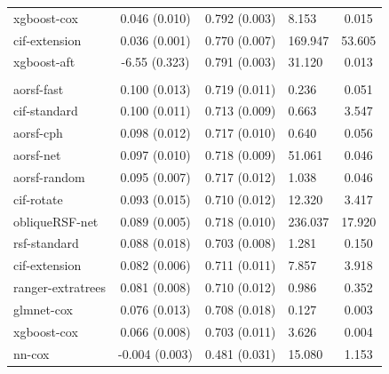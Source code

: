 \documentclass[twoside,11pt]{article}\usepackage[]{graphicx}\usepackage[]{xcolor}
\newenvironment{knitrout}{}{} %
\begin{document}
\begin{knitrout}
\begin{longtable}[t]{lcclc}
\hspace{1em}xgboost-cox & 0.046 (0.010) & 0.792 (0.003) & 8.153 & 0.015\\
\hspace{1em}cif-extension & 0.036 (0.001) & 0.770 (0.007) & 169.947 & 53.605\\
\hspace{1em}xgboost-aft & -6.55 (0.323) & 0.791 (0.003) & 31.120 & 0.013\\
\addlinespace[0.3em]
\hline
\multicolumn{5}{l}{\textit{\textbf{Colon cancer; death, n = 929, p = 12}}}\\
\hline
\hspace{1em}aorsf-fast & 0.100 (0.013) & 0.719 (0.011) & 0.236 & 0.051\\
\hspace{1em}cif-standard & 0.100 (0.011) & 0.713 (0.009) & 0.663 & 3.547\\
\hspace{1em}aorsf-cph & 0.098 (0.012) & 0.717 (0.010) & 0.640 & 0.056\\
\hspace{1em}aorsf-net & 0.097 (0.010) & 0.718 (0.009) & 51.061 & 0.046\\
\hspace{1em}aorsf-random & 0.095 (0.007) & 0.717 (0.012) & 1.038 & 0.046\\
\hspace{1em}cif-rotate & 0.093 (0.015) & 0.710 (0.012) & 12.320 & 3.417\\
\hspace{1em}obliqueRSF-net & 0.089 (0.005) & 0.718 (0.010) & 236.037 & 17.920\\
\hspace{1em}rsf-standard & 0.088 (0.018) & 0.703 (0.008) & 1.281 & 0.150\\
\hspace{1em}cif-extension & 0.082 (0.006) & 0.711 (0.011) & 7.857 & 3.918\\
\hspace{1em}ranger-extratrees & 0.081 (0.008) & 0.710 (0.012) & 0.986 & 0.352\\
\hspace{1em}glmnet-cox & 0.076 (0.013) & 0.708 (0.018) & 0.127 & 0.003\\
\hspace{1em}xgboost-cox & 0.066 (0.008) & 0.703 (0.011) & 3.626 & 0.004\\
\hspace{1em}nn-cox & -0.004 (0.003) & 0.481 (0.031) & 15.080 & 1.153\\

\end{longtable}
\end{knitrout}
\end{document}
